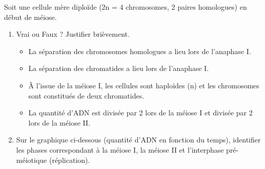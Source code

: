 \documentclass[11pt]{article}
\begin{document}
\begin{exercice}
Soit une cellule mère diploïde (2n = 4 chromosomes, 2 paires homologues) en début de méiose.
\begin{enumerate}
    \item Vrai ou Faux ? Justifier brièvement.
    \begin{itemize}
        \item[ ] La séparation des chromosomes homologues a lieu lors de l'anaphase I.
        \item[ ] La séparation des chromatides a lieu lors de l'anaphase I.
        \item[ ] À l'issue de la méiose I, les cellules sont haploïdes (n) et les chromosomes sont constitués de deux chromatides.
        \item[ ] La quantité d'ADN est divisée par 2 lors de la méiose I et divisée par 2 lors de la méiose II.
    \end{itemize}
    \item Sur le graphique ci-dessous (quantité d'ADN en fonction du temps), identifier les phases correspondant à la méiose I, la méiose II et l'interphase pré-méiotique (réplication).
    \begin{center}
    \end{center}
\end{enumerate}
\end{exercice}
\end{document}
